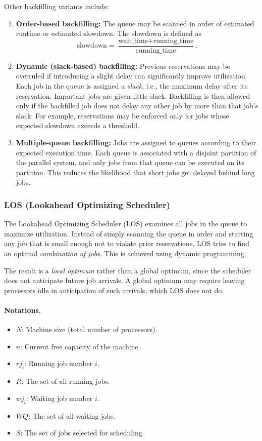 \documentclass[12pt]{book}
\begin{document}
Other backfilling variants include:
\begin{enumerate}
    \item \textbf{Order-based backfilling:} The queue may be scanned in order of estimated runtime or estimated slowdown. The slowdown is defined as
    \[
      \text{slowdown} = \frac{\text{wait\_time} + \text{running\_time}}{\text{running\_time}}.
    \]
    \item \textbf{Dynamic (slack-based) backfilling:} Previous reservations may be overruled if introducing a slight delay can significantly improve utilization. Each job in the queue is assigned a \emph{slack}, i.e., the maximum delay after its reservation. Important jobs are given little slack. Backfilling is then allowed only if the backfilled job does not delay any other job by more than that job's slack. For example, reservations may be enforced only for jobs whose expected slowdown exceeds a threshold.
    \item \textbf{Multiple-queue backfilling:} Jobs are assigned to queues according to their expected execution time. Each queue is associated with a disjoint partition of the parallel system, and only jobs from that queue can be executed on its partition. This reduces the likelihood that short jobs get delayed behind long jobs.
\end{enumerate}

\subsubsection{LOS (Lookahead Optimizing Scheduler)}
The Lookahead Optimizing Scheduler (LOS) examines all jobs in the queue to maximize utilization. Instead of simply scanning the queue in order and starting any job that is small enough not to violate prior reservations, LOS tries to find an optimal \emph{combination of jobs}. This is achieved using dynamic programming.  

The result is a \emph{local optimum} rather than a global optimum, since the scheduler does not anticipate future job arrivals. A global optimum may require leaving processors idle in anticipation of such arrivals, which LOS does not do.

\paragraph{Notations.}
\begin{itemize}
    \item $N$: Machine size (total number of processors).
    \item $n$: Current free capacity of the machine.
    \item $rj_i$: Running job number $i$.
    \item $R$: The set of all running jobs.
    \item $wj_i$: Waiting job number $i$.
    \item $WQ$: The set of all waiting jobs.
    \item $S$: The set of jobs selected for scheduling.
\end{itemize}
\end{document}
